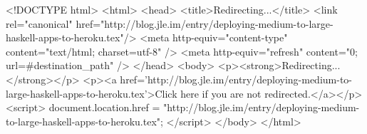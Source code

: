 <!DOCTYPE html>
<html>
<head>
<title>Redirecting...</title>
<link rel="canonical" href="http://blog.jle.im/entry/deploying-medium-to-large-haskell-apps-to-heroku.tex"/>
<meta http-equiv="content-type" content="text/html; charset=utf-8" />
<meta http-equiv="refresh" content="0; url=#{destination_path}" />
</head>
<body>
  <p><strong>Redirecting...</strong></p>
  <p><a href='http://blog.jle.im/entry/deploying-medium-to-large-haskell-apps-to-heroku.tex'>Click here if you are not redirected.</a></p>
  <script>
    document.location.href = "http://blog.jle.im/entry/deploying-medium-to-large-haskell-apps-to-heroku.tex";
  </script>
</body>
</html>
